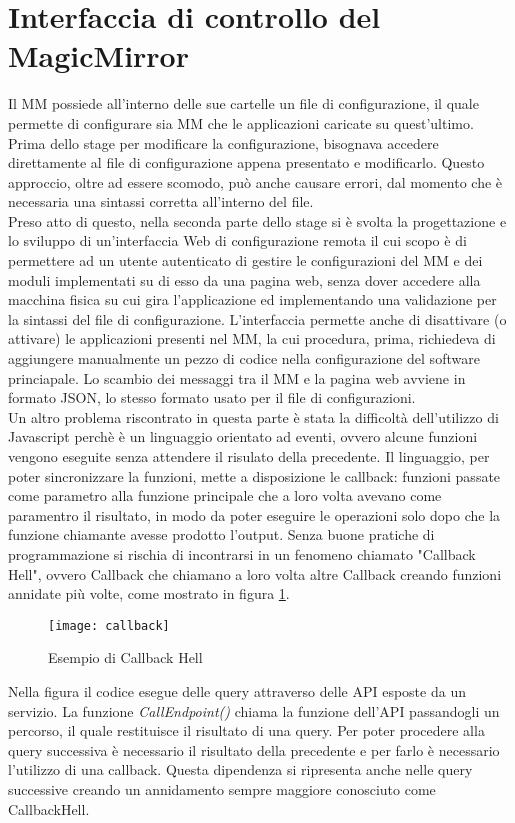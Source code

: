 \section{Interfaccia di controllo del MagicMirror}\label{cap:interfacciaproblemi}
Il MM possiede all'interno delle sue cartelle un file di configurazione, il quale permette
di configurare sia MM che le applicazioni caricate su quest'ultimo.
Prima dello stage per modificare la configurazione, bisognava accedere direttamente al file di configurazione
appena presentato e modificarlo. Questo approccio, oltre ad essere scomodo, pu\`o anche
causare errori, dal momento che \`e necessaria una sintassi corretta all'interno del file.\\[1\baselineskip]
Preso atto di questo, nella seconda parte dello stage si \`e svolta la progettazione e lo sviluppo di un'interfaccia Web di configurazione remota
il cui scopo \`e di permettere ad un utente autenticato di gestire
le configurazioni del MM e dei moduli implementati su di esso da una pagina web,
senza dover accedere alla macchina fisica su cui gira l'applicazione ed implementando
una validazione per la sintassi del file di configurazione.
L'interfaccia permette anche di disattivare (o attivare) le applicazioni presenti nel MM,
la cui procedura, prima, richiedeva di aggiungere manualmente un pezzo di codice nella
configurazione del software princiapale.
Lo scambio dei messaggi tra il MM e la pagina web avviene in formato JSON, lo stesso formato
usato per il file di configurazioni.\\
Un altro problema riscontrato in questa parte \`e stata la difficolt\`a dell'utilizzo di Javascript
perch\`e \`e un linguaggio orientato ad eventi, ovvero alcune funzioni vengono eseguite senza attendere
il risulato della precedente. Il linguaggio, per poter sincronizzare la funzioni, mette a disposizione
le callback: funzioni passate come parametro alla funzione principale che a loro volta avevano come paramentro il risultato,
in modo da poter eseguire le operazioni solo dopo che la funzione chiamante avesse prodotto l'output.
Senza buone pratiche di programmazione si rischia di incontrarsi in un fenomeno chiamato "Callback Hell", ovvero Callback che chiamano a loro volta
altre Callback creando funzioni annidate pi\`u volte, come mostrato in figura \ref{fig:hell}.
\begin{figure}[H]
    \texttt{[image: callback]}
    \caption{Esempio di Callback Hell}
    \label{fig:hell}
\end{figure}
Nella figura il codice esegue delle query attraverso delle API esposte da un servizio. La funzione \textit{CallEndpoint()} chiama la funzione dell'API passandogli
un percorso, il quale restituisce il risultato di una query. Per poter procedere alla query successiva è necessario il risultato della precedente e per farlo
è necessario l'utilizzo di una callback. Questa dipendenza si ripresenta anche nelle query successive creando un annidamento sempre maggiore conosciuto
come CallbackHell.
